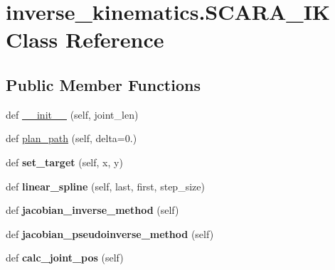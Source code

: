 \hypertarget{classinverse__kinematics_1_1_s_c_a_r_a___i_k}{}\section{inverse\+\_\+kinematics.\+S\+C\+A\+R\+A\+\_\+\+IK Class Reference}
\label{classinverse__kinematics_1_1_s_c_a_r_a___i_k}
\subsection*{Public Member Functions}
\begin{DoxyCompactItemize}
\item 
def \hyperlink{classinverse__kinematics_1_1_s_c_a_r_a___i_k_a68c331184cb5d0b9bc28567922cedd01}{\+\_\+\+\_\+init\+\_\+\+\_\+} (self, joint\+\_\+len)
\item 
def \hyperlink{classinverse__kinematics_1_1_s_c_a_r_a___i_k_ac5dd573c899961b0b402ecab76c34499}{plan\+\_\+path} (self, delta=0.)
\item 
\mbox{\label{classinverse__kinematics_1_1_s_c_a_r_a___i_k_aaeb154dd436a588ef5363b71402bfbea}} 
def {\bfseries set\+\_\+target} (self, x, y)
\item 
\mbox{\label{classinverse__kinematics_1_1_s_c_a_r_a___i_k_aa94976c8e18b7c591c5df10adaa0aeb2}} 
def {\bfseries linear\+\_\+spline} (self, last, first, step\+\_\+size)
\item 
\mbox{\label{classinverse__kinematics_1_1_s_c_a_r_a___i_k_afa9572a2aea8af0d0fbb72bc002e08d4}} 
def {\bfseries jacobian\+\_\+inverse\+\_\+method} (self)
\item 
\mbox{\label{classinverse__kinematics_1_1_s_c_a_r_a___i_k_a7ee747d7965af2222bfee3f208ef9228}} 
def {\bfseries jacobian\+\_\+pseudoinverse\+\_\+method} (self)
\item 
\mbox{\label{classinverse__kinematics_1_1_s_c_a_r_a___i_k_aa382d8317262aedf27231f6376a08f2b}} 
def {\bfseries calc\+\_\+joint\+\_\+pos} (self)
\item 
\mbox{\label{classinverse__kinematics_1_1_s_c_a_r_a___i_k_a778650d0d211dd62191b0709c7a57e43}} 

\end{DoxyCompactItemize}

